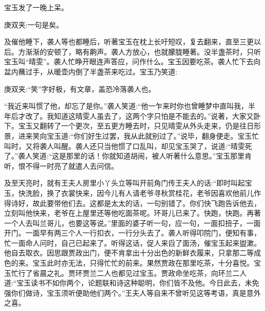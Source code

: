 \begin{parag}
    宝玉发了一晚上呆。\begin{note}庚双夹:一句是矣。\end{note}及催他睡下，袭人等也都睡后，听著宝玉在枕上长吁短叹，复去翻来，直至三更以后。方渐渐的安顿了，略有齁声。袭人方放心，也就朦胧睡著。没半盏茶时，只听宝玉叫“晴雯”。袭人忙睁开眼连声答应，问作什么。宝玉因要吃茶。袭人忙下去向盆内蘸过手，从暖壶内倒了半盏茶来吃过。宝玉乃笑道:\begin{note}庚双夹:“笑”字好极，有文章，盖恐冷落袭人也。\end{note}“我近来叫惯了他，却忘了是你。”袭人笑道:“他一乍来时你也曾睡梦中直叫我，半年后才改了。我知道这晴雯人虽去了，这两个字只怕是不能去的。”说著，大家又卧下。宝玉又翻转了一个更次，至五更方睡去时，只见晴雯从外头走来，仍是往日形景，进来笑向宝玉道:“你们好生过罢，我从此就别过了。”说毕，翻身便走。宝玉忙叫时，又将袭人叫醒。袭人还只当他惯了口乱叫，却见宝玉哭了，说道:“晴雯死了。”袭人笑道:“这是那里的话！你就知道胡闹，被人听著什么意思。”宝玉那里肯听，恨不得一时亮了就遣人去问信。
\end{parag}


\begin{parag}
    及至天亮时，就有王夫人房里小丫头立等叫开前角门传王夫人的话:“即时叫起宝玉，快洗脸，换了衣裳快来，因今儿有人请老爷寻秋赏桂花，老爷因喜欢他前儿作得诗好，故此要带他们去。这都是太太的话，一句别错了。你们快飞跑告诉他去，立刻叫他快来，老爷在上屋里还等他吃面茶呢。环哥儿已来了。快跑，快跑。再著一个人去叫兰哥儿，也要这等说。”里面的婆子听一句，应一句，一面扣扭子，一面开门。一面早有两三个人一行扣衣，一行分头去了。袭人听得叩院门，便知有事，忙一面命人问时，自己已起来了。听得这话，促人来舀了面汤，催宝玉起来盥漱。他自去取衣。因思跟贾政出门，便不肯拿出十分出色的新鲜衣履来，只拿那二等成色的来。宝玉此时亦无法，只得忙忙的前来。果然贾政在那里吃茶，十分喜悦。宝玉忙行了省晨之礼。贾环贾兰二人也都见过宝玉。贾政命坐吃茶，向环兰二人道:“宝玉读书不如你两个，论题联和诗这种聪明，你们皆不及他。今日此去，未免强你们做诗，宝玉须听便助他们两个。”王夫人等自来不曾听见这等考语，真是意外之喜。
\end{parag}


